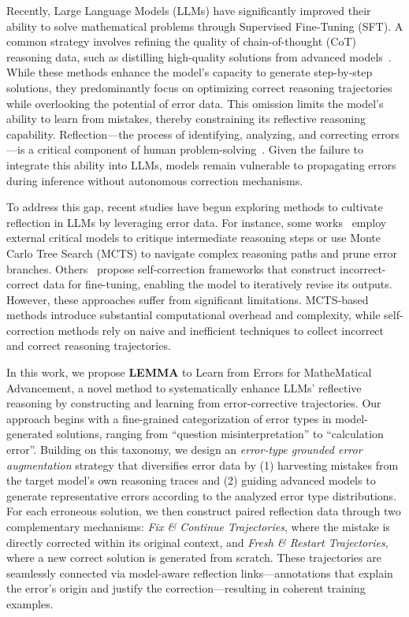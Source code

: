 \documentclass[11pt]{article}
\begin{document}
Recently, Large Language Models (LLMs) have significantly improved their ability to solve mathematical problems through Supervised Fine-Tuning (SFT). A common strategy involves refining the quality of chain-of-thought (CoT) reasoning data, such as distilling high-quality solutions from advanced models~\cite{magister2023teaching,yu2distilling}. While these methods enhance the model's capacity to generate step-by-step solutions, they predominantly focus on optimizing correct reasoning trajectories while overlooking the potential of error data. This omission limits the model's ability to learn from mistakes, thereby constraining its reflective reasoning capability. Reflection—the process of identifying, analyzing, and correcting errors—is a critical component of human problem-solving~\cite{stacey1982thinking}. Given the failure to integrate this ability into LLMs, models remain vulnerable to propagating errors during inference without autonomous correction mechanisms.

To address this gap, recent studies have begun exploring methods to cultivate reflection in LLMs by leveraging error data. For instance, some works~\cite{xi2024enhancing,li2024hindsight,qin2024o1,guan2025rstar} employ external critical models to critique intermediate reasoning steps or use Monte Carlo Tree Search (MCTS) to navigate complex reasoning paths and prune error branches. Others~\cite{yan2024s,han2024small,zhang-etal-2024-small,yang2024confidence} propose self-correction frameworks that construct incorrect-correct data for fine-tuning, enabling the model to iteratively revise its outputs. However, these approaches suffer from significant limitations. MCTS-based methods introduce substantial computational overhead and complexity, while self-correction methods rely on naive and inefficient techniques to collect incorrect and correct reasoning trajectories.

In this work, we propose \textbf{LEMMA} to Learn from Errors for MatheMatical Advancement, a novel method to systematically enhance LLMs' reflective reasoning by constructing and learning from error-corrective trajectories. Our approach begins with a fine-grained categorization of error types in model-generated solutions, ranging from ``question misinterpretation'' to ``calculation error''. Building on this taxonomy, we design an \textit{error-type grounded error augmentation} strategy that diversifies error data by (1) harvesting mistakes from the target model's own reasoning traces and (2) guiding advanced models to generate representative errors according to the analyzed error type distributions. For each erroneous solution, we then construct paired reflection data through two complementary mechanisms: \textit{Fix \& Continue Trajectories}, where the mistake is directly corrected within its original context, and \textit{Fresh \& Restart Trajectories}, where a new correct solution is generated from scratch. These trajectories are seamlessly connected via model-aware reflection links—annotations that explain the error's origin and justify the correction—resulting in coherent training examples. 
\end{document}
